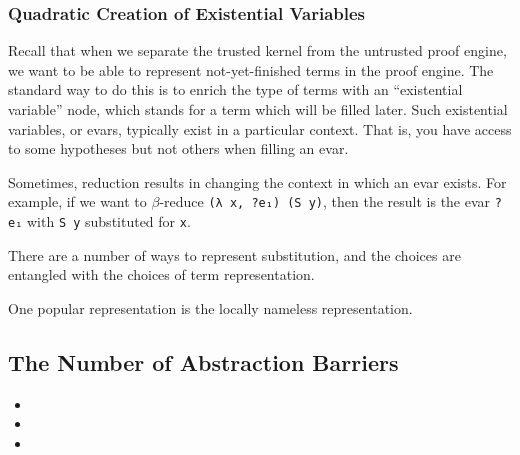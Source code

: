 \subsubsection{Quadratic Creation of Existential Variables}
Recall  that when we separate the trusted kernel from the untrusted proof engine, we want to be able to represent not-yet-finished terms in the proof engine.
The standard way to do this is to enrich the type of terms with an ``existential variable'' node, which stands for a term which will be filled later.
Such existential variables, or evars, typically exist in a particular context.
That is, you have access to some hypotheses but not others when filling an evar.

Sometimes, reduction results in changing the context in which an evar exists.
For example, if we want to $\beta$-reduce \texttt{(λ x, ?e₁) (S y)}, then the result is the evar \texttt{?e₁} with \texttt{S y} substituted for \texttt{x}.

There are a number of ways to represent substitution, and the choices are entangled with the choices of term representation.

One popular representation is the locally nameless representation.~\cite{locally-nameless}




\subsection{The Number of Abstraction Barriers}
\begin{itemize}
\item {}
\item {}
\item {}
\end{itemize}


